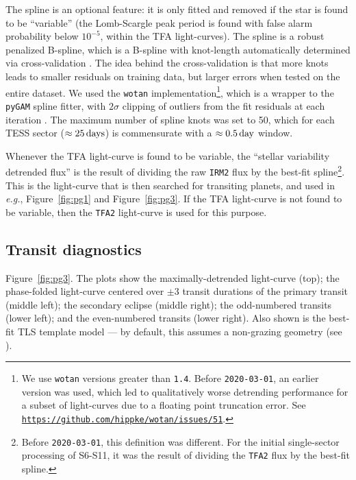 \documentclass[12pt,twocolumn,tighten]{aastex62}
\begin{document}
The spline is an optional feature: it is only fitted and removed if
the star is found to be ``variable'' (the Lomb-Scargle peak period is
found with false alarm probability below $10^{-5}$, within the TFA light-curves). The spline is a
robust penalized B-spline, which is a B-spline with knot-length
automatically determined via cross-validation
\citep{eilers_flexible_1996}. The idea behind the cross-validation is
that more knots leads to smaller residuals on training data, but
larger errors when tested on the entire dataset.  We used the
\texttt{wotan} implementation\footnote{
We use \texttt{wotan} versions greater than \texttt{1.4}. Before \texttt{2020-03-01}, an earlier version
was used, which led to qualitatively worse detrending performance for a subset
of light-curves due to a floating point truncation error. See \texttt{\url{https://github.com/hippke/wotan/issues/51}}.
}, which is a wrapper to the
\texttt{pyGAM} spline fitter, with $2\sigma$ clipping of outliers from
the fit residuals at each iteration
\citep{serven_pygam_2018_1476122,hippke_wotan_2019}.  The maximum
number of spline knots was set to 50, which for each TESS sector
($\approx 25\,{\rm days}$) is commensurate with a $\approx0.5\,{\rm
day}$ window.

Whenever the TFA light-curve is found to be variable, the ``stellar variability detrended flux'' is
the result of dividing the raw \texttt{IRM2} flux by the best-fit spline\footnote{
Before \texttt{2020-03-01}, this definition was different. For the initial
single-sector processing of S6-S11, it was the result of dividing the \texttt{TFA2} flux
by the best-fit spline.
}.
This is the light-curve that is then searched for transiting planets, and used
in {\it e.g.}, Figure~\ref{fig:pg1} and Figure~\ref{fig:pg3}.
If the TFA light-curve is not found to be variable, then the \texttt{TFA2} light-curve is used for
this purpose.


\subsection{Transit diagnostics}
\label{sec:pg3}

Figure~\ref{fig:pg3}.
The plots show the maximally-detrended light-curve (top); the
phase-folded light-curve centered over $\pm3$ transit durations of the
primary transit (middle left); the secondary eclipse (middle right);
the odd-numbered transits (lower left); and the even-numbered transits
(lower right).
Also shown is the best-fit TLS template model --- by default, this
assumes a non-grazing geometry (see \citealt{hippke_TLS_2019}).
\end{document}
